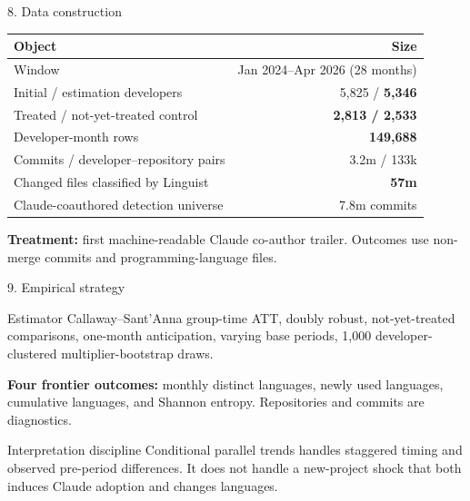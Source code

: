 \documentclass[aspectratio=169,10pt]{beamer}
\begin{document}
\begin{frame}{8. Data construction}
\centering\small
\begin{tabular}{lr}
\toprule Object & Size \\
\midrule
Window & Jan 2024--Apr 2026 (28 months) \\
Initial / estimation developers & 5,825 / \textbf{5,346} \\
Treated / not-yet-treated control & \textbf{2,813 / 2,533} \\
Developer-month rows & \textbf{149,688} \\
Commits / developer--repository pairs & 3.2m / 133k \\
Changed files classified by Linguist & \textbf{57m} \\
Claude-coauthored detection universe & 7.8m commits \\
\bottomrule
\end{tabular}
\vspace{.8em}
\textbf{Treatment:} first machine-readable Claude co-author trailer. Outcomes use non-merge commits and programming-language files.
\end{frame}

\begin{frame}{9. Empirical strategy}
\begin{block}{Estimator}
Callaway--Sant'Anna group-time ATT, doubly robust, not-yet-treated comparisons, one-month anticipation, varying base periods, 1,000 developer-clustered multiplier-bootstrap draws.
\end{block}
\textbf{Four frontier outcomes:} monthly distinct languages, newly used languages, cumulative languages, and Shannon entropy. Repositories and commits are diagnostics.
\vspace{.6em}
\begin{alertblock}{Interpretation discipline}
Conditional parallel trends handles staggered timing and observed pre-period differences. It does not handle a new-project shock that both induces Claude adoption and changes languages.
\end{alertblock}
\end{frame}
\end{document}
